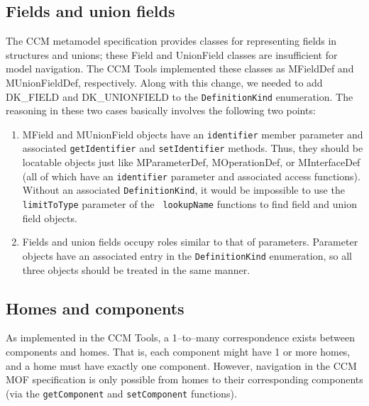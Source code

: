 \subsection{Fields and union fields}
\label{subsection:metamodel-problems-fields}

The CCM metamodel specification provides classes for representing fields in
structures and unions; these Field and UnionField classes are insufficient for
model navigation. The CCM Tools implemented these classes as MFieldDef and
MUnionFieldDef, respectively. Along with this change, we needed to add DK\_FIELD
and DK\_UNIONFIELD to the {\tt DefinitionKind} enumeration. The reasoning in
these two cases basically involves the following two points:

\begin{enumerate}
\item MField and MUnionField objects have an {\tt identifier} member parameter
      and associated {\tt getIdentifier} and {\tt setIdentifier} methods. Thus,
      they should be locatable objects just like MParameterDef, MOperationDef,
      or MInterfaceDef (all of which have an {\tt identifier} parameter and
      associated access functions). Without an associated {\tt DefinitionKind},
      it would be impossible to use the {\tt limitToType} parameter of the {\tt
      lookupName} functions to find field and union field objects.
\item Fields and union fields occupy roles similar to that of parameters.
      Parameter objects have an associated entry in the {\tt DefinitionKind}
      enumeration, so all three objects should be treated in the same manner.
\end{enumerate}

\subsection{Homes and components}

As implemented in the CCM Tools, a 1--to--many correspondence exists between
components and homes. That is, each component might have 1 or more homes, and a
home must have exactly one component. However, navigation in the CCM MOF
specification is only possible from homes to their corresponding components (via
the {\tt getComponent} and {\tt setComponent} functions).

